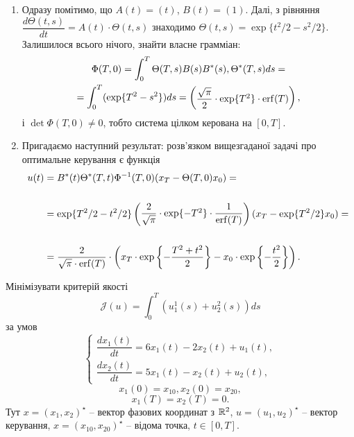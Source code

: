 \begin{solution}
\begin{enumerate}
    \item Одразу помітимо, що $A(t) = (t)$, $B(t) = (1)$. Далі, з рівняння $\dfrac{d\Theta(t,s)}{dt} = A(t) \cdot \Theta(t,s)$ знаходимо $\Theta(t,s) = \exp\{t^2 / 2 - s^2 / 2\}$. Залишилося всього нічого, знайти власне грамміан:
    \begin{multline*} \Phi(T,0) = \int_0^T \Theta(T,s)B(s)B^*(s),\Theta^*(T,s) ds = \\ = \int_0^T (\exp\{T^2 - s^2\}) ds = \begin{pmatrix}\dfrac{\sqrt \pi}{2} \cdot \exp\{T^2\} \cdot \operatorname{erf}(T) \end{pmatrix}, \end{multline*} і $\det\Phi(T,0)\ne0$, тобто система цілком керована на $[0, T]$.
    \item Пригадаємо наступний результат: розв'язком вищезгаданої задачі про оптимальне керування є функція
    \begin{align*}
        u(t) &= B^*(t) \Theta^*(T,t)\Phi^{-1}(T,0)(x_T-\Theta(T,0) x_0) = \\
        \\
        &= \exp\{T^2 / 2 - t^2 / 2\} \begin{pmatrix}\dfrac2{\sqrt \pi} \cdot \exp\{-T^2\} \cdot \dfrac1{\operatorname{erf}(T)} \end{pmatrix} (x_T - \exp\{T^2 / 2\} x_0) = \\
        \\
        &= \dfrac{2}{\sqrt{\pi}\cdot \operatorname{erf}(T)} \cdot \left(x_T \cdot \exp\left\{-\dfrac{T^2+t^2}2\right\} - x_0 \cdot \exp\left\{- \dfrac{t^2}2\right\}\right).
    \end{align*} 
\end{enumerate}
\end{solution} 

\begin{problem}
\end{problem}

\begin{solution}
\end{solution}

\begin{problem}
    Мінімізувати критерій якості 
    \[ \mathcal{J}(u) = \int_0^T (u_1^1(s) + u_2^2(s)) ds \]
    за умов \[ \left\{ \begin{aligned} \dfrac{dx_1(t)}{dt} = 6x_1(t) - 2x_2(t) + u_1(t), \\ \dfrac{dx_2(t)}{dt} = 5x_1(t) - x_2(t) + u_2(t), \end{aligned} \right. \]
    \[ x_1(0) = x_{10}, x_2(0) = x_{20}, \] 
    \[ x_1(T) = x_2(T) = 0. \]
    Тут $x = (x_1, x_2)^\star$ -- вектор фазових координат з $\mathbb{R}^2$, $u=(u_1,u_2)^\star$ -- вектор керування, $x = (x_{10}, x_{20})^\star$ -- відома точка, $t \in [0, T]$.
\end{problem}

